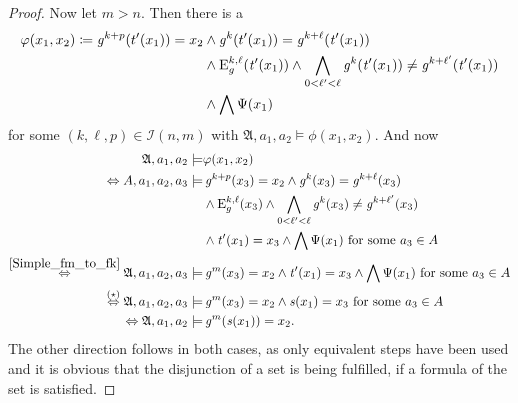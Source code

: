 \begin{proof}
	Now let $m>n$.
	Then there is a
	\begin{align*}
		\varphi(x_1,x_2)\coloneqq \operatorname{\mathit{g}}^{k+p}(t'(x_1))=x_2 &\land \operatorname{\mathit{g}}^{k}(t'(x_1))=\operatorname{\mathit{g}}^{k+\ell}(\operatorname{\mathit{t}}'(x_1)) \\
		& \land \operatorname{E}^{k,\ell}_g(\operatorname{\mathit{t}}'(x_1)) \land \bigwedge_{0<\ell'<\ell} \operatorname{\mathit{g}}^{k}(\operatorname{\mathit{t}}'(x_1))\neq \operatorname{\mathit{g}}^{k+\ell'}(\operatorname{\mathit{t}}'(x_1)) \\
		& \land \bigwedge \Psi(x_1)
	\end{align*}
	for some $(k,\ell,p)\in\mathcal I(n,m)$ with $\mathfrak A,a_1,a_2\models \phi(x_1,x_2)$.
	And now
	\begin{align*}
		\mathfrak A,a_1,a_2 \models & \varphi(x_1,x_2) \\
		\Leftrightarrow A,a_1,a_2,a_3 \models &\operatorname{\mathit{g}}^{k+p}(x_3)=x_2 \land \operatorname{\mathit{g}}^{k}(x_3)=\operatorname{\mathit{g}}^{k+\ell}(x_3) \\
		& \land \operatorname{E}^{k,\ell}_g(x_3) \land \bigwedge_{0<\ell'<\ell} \operatorname{\mathit{g}}^{k}(x_3)\neq \operatorname{\mathit{g}}^{k+\ell'}(x_3) \\
		& \land \operatorname{\mathit{t}}'(x_1)=x_3 \land \bigwedge\Psi(x_1) \text{ for some } a_3\in A \\
		\overset{\ref{Simple_fm_to_fk}}{\Leftrightarrow} \mathfrak A, a_1,a_2,a_3 \models & \operatorname{\mathit{g}}^{m}(x_3)=x_2 \land \operatorname{\mathit{t}}'(x_1)=x_3 \land \bigwedge\Psi(x_1) \text{ for some } a_3 \in A \\
		\overset{(\star)}{\Leftrightarrow} \mathfrak A,a_1,a_2,a_3 \models & \operatorname{\mathit{g}}^{m}(x_3)=x_2\land \operatorname{\mathit{s}}(x_1)=x_3 \text{ for some } a_3\in A \\
		\Leftrightarrow \mathfrak A,a_1,a_2 \models & \operatorname{\mathit{g}}^{m}(\operatorname{\mathit{s}}(x_1))=x_2.
	\end{align*}
	The other direction follows in both cases, as only equivalent steps have been used and it is obvious that the disjunction of a set is being fulfilled, if a formula of the set is satisfied.
	

\end{proof}
